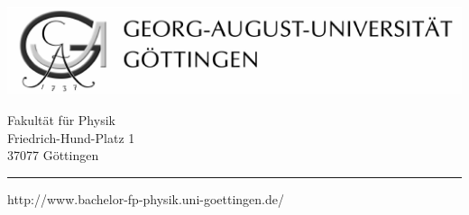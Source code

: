 \documentclass[a4paper,12pt]{article}
\begin{document}
\thispagestyle{empty}
\begin{minipage}{88mm}
\includegraphics{Logo_komplett_grau_links_400.pdf}
\end{minipage}\hfill
\begin{minipage}{70mm}
\begin{flushright}
{\sf
Fakultät für Physik\\
Friedrich-Hund-Platz 1\\
37077 Göttingen}
\end{flushright}
\end{minipage}
\hrule
\vspace{-5mm}
\begin{flushright}
{\sf http://www.bachelor-fp-physik.uni-goettingen.de/}
\end{flushright}
\vspace{20mm}
\end{document}
